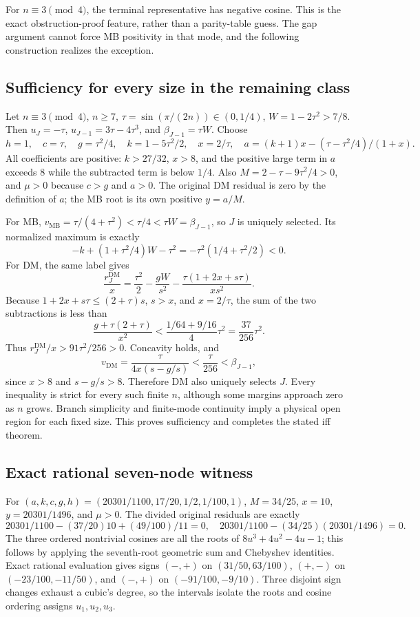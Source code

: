 \documentclass[11pt]{article}
\newcommand{\DM}{\mathrm{DM}}
\newcommand{\MB}{\mathrm{MB}}
\begin{document}
For $n\equiv3\pmod4$, the terminal representative has negative
cosine. This is the exact obstruction-proof feature, rather than a
parity-table guess. The gap argument cannot force MB positivity in
that mode, and the following construction realizes the exception.

\subsection{Sufficiency for every size in the remaining class}
Let $n\equiv3\pmod4$, $n\ge7$,
$\tau=\sin(\pi/(2n))\in(0,1/4)$,
$W=1-2\tau^2>7/8$. Then $u_J=-\tau$,
$u_{J-1}=3\tau-4\tau^3$, and $\beta_{J-1}=\tau W$.
Choose
\[
 h=1,\quad c=\tau,\quad g=\tau^2/4,\quad
 k=1-5\tau^2/2,\quad x=2/\tau,\quad
 a=(k+1)x-(\tau-\tau^2/4)/(1+x).
\]
All coefficients are positive: $k>27/32$, $x>8$, and the positive
large term in $a$ exceeds $8$ while the subtracted term is below $1/4$.
Also $M=2-\tau-9\tau^2/4>0$, and $\mu>0$ because $c>g$ and
$a>0$. The original DM residual is zero by the definition of $a$;
the MB root is its own positive $y=a/M$.

For MB,
$v_{\MB}=\tau/(4+\tau^2)<\tau/4<\tau W=\beta_{J-1}$,
so $J$ is uniquely selected. Its normalized maximum is exactly
\[
 -k+(1+\tau^2/4)W-\tau^2
 =-\tau^2(1/4+\tau^2/2)<0.
\]
For DM, the same label gives
\[
 \frac{r_J^{\DM}}x=\frac{\tau^2}{2}-\frac{gW}{s^2}
                  -\frac{\tau(1+2x+s\tau)}{xs^2}.
\]
Because $1+2x+s\tau\le(2+\tau)s$, $s>x$, and $x=2/\tau$,
the sum of the two subtractions is less than
\[
 \frac{g+\tau(2+\tau)}{x^2}
 <\frac{1/64+9/16}{4}\tau^2
 =\frac{37}{256}\tau^2.
\]
Thus $r_J^{\DM}/x>91\tau^2/256>0$. Concavity holds, and
\[
 v_{\DM}=\frac{\tau}{4x(s-g/s)}<\frac{\tau}{256}
                         <\beta_{J-1},
\]
since $x>8$ and $s-g/s>8$. Therefore DM also uniquely selects $J$.
Every inequality is strict for every such finite $n$, although some
margins approach zero as $n$ grows. Branch simplicity and finite-mode
continuity imply a physical open region for each fixed size. This
proves sufficiency and completes the stated iff theorem.

\subsection{Exact rational seven-node witness}
For $(a,k,c,g,h)=(20301/1100,17/20,1/2,1/100,1)$,
$M=34/25$, $x=10$, $y=20301/1496$, and $\mu>0$.
The divided original residuals are exactly
\[
 20301/1100-(37/20)10+(49/100)/11=0,
 \quad20301/1100-(34/25)(20301/1496)=0.
\]
The three ordered nontrivial cosines are all the roots of
$8u^3+4u^2-4u-1$; this follows by applying the seventh-root geometric
sum and Chebyshev identities. Exact rational evaluation gives signs
$(-,+)$ on $(31/50,63/100)$, $(+,-)$ on
$(-23/100,-11/50)$, and $(-,+)$ on $(-91/100,-9/10)$.
Three disjoint sign changes exhaust a cubic's degree, so the intervals
isolate the roots and cosine ordering assigns $u_1,u_2,u_3$.
\end{document}
